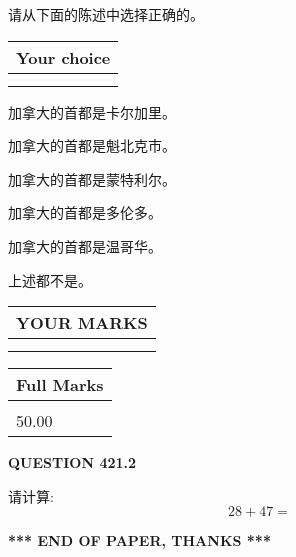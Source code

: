 \documentclass{ctexart}
\begin{document}
  
请从下面的陈述中选择正确的。
  
  
\noindent\hspace{3.0in} \begin{tabular}{|l|}
\hline
Your choice \\
\hline
 \\ 
 \\ 
\hline
\end{tabular}
  
  
 
 
加拿大的首都是卡尔加里。
 
 
加拿大的首都是魁北克市。
 
 
加拿大的首都是蒙特利尔。
 
 
加拿大的首都是多伦多。
 
 
加拿大的首都是温哥华。
 
 
 上述都不是。
 
 
  
\vspace{0.2in}
  
\noindent\begin{tabular}{|l|}
\hline
 YOUR MARKS  \\
\hline
 \\ 
 \\ 
\hline
\end{tabular}
\hspace{0.05in} \begin{tabular}{|l|}
\hline
 Full Marks  \\
\hline
 \\ 
50.00 \\
\hline
\end{tabular}
{\textbf{\Large{QUESTION
421.2 
}}}
  
  
 
请计算:
\begin{equation}
28 +  %
47 = \nonumber
\end{equation}
 

 

 
   
   
 \vspace{0.2in}
 
   
   
   
   
\vspace{1.0in} 
{\textbf{\large{ *** END OF PAPER, THANKS *** }}} 
   
\end{document}

